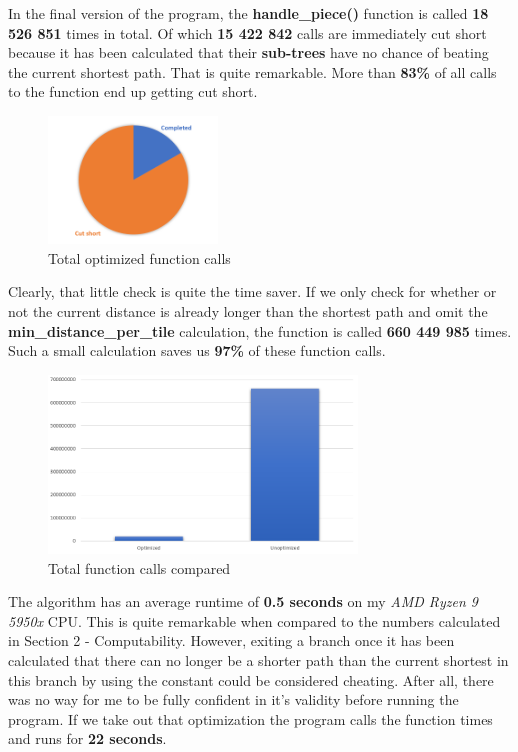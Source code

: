 \documentclass[12pt]{article}
\begin{document}
In the final version of the program, the \textbf{handle\_piece()} function is called \linebreak \textbf{18 526 851} times in total. Of which \textbf{15 422 842} calls are immediately cut short because it has been calculated that their \textbf{sub-trees} have no chance of beating the current shortest path. That is quite remarkable. More than \textbf{83\%} of all calls to the function end up getting cut short. 

\begin{figure}[htbp]
    \centering
    \includegraphics[width=0.4\textwidth]{images/Figure14}
    \caption{Total optimized function calls}
    \label{fig:func-call-diagram-1}
\end{figure}

Clearly, that little check is quite the time saver. If we only check for whether or not the current distance is already longer than the shortest path and omit the \textbf{min\_distance\_per\_tile} calculation, the function is called \textbf{660 449 985} times. Such a small calculation saves us \textbf{97\%} of these function calls.

\begin{figure}[htbp]
    \centering
    \includegraphics[width=0.73\textwidth]{images/Figure15}
    \caption{Total function calls compared}
    \label{fig:func-call-diagram-2}
\end{figure}

\newpage

The algorithm has an average runtime of \textbf{0.5 seconds} on my \textit{AMD Ryzen 9 5950x} CPU. This is quite remarkable when compared to the numbers calculated in Section 2 - Computability. However, exiting a branch once it has been calculated that there can no longer be a shorter path than the current shortest in this branch by using the   constant could be considered cheating. After all, there was no way for me to be fully confident in it's validity before running the program.
If we take out that optimization the program calls the function  times and runs for \textbf{22 seconds}.
\end{document}
